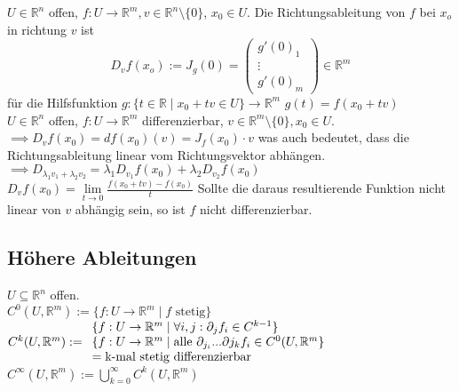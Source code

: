   \(U\in\mathbb{R}^n\) offen, \(f:U\rightarrow \mathbb{R}^m, v\in\mathbb{R}^n\setminus\{0\}\), \(x_0\in U\). Die Richtungsableitung von \(f\) bei \(x_o\) in richtung \(v\) ist \[D_v f(x_o) := J_g(0)=\begin{pmatrix}g'(0)_1\\\vdots\\g'(0)_m\end{pmatrix}\in\mathbb R^m\] für die Hilfsfunktion \(g : \{t\in\mathbb R\mid x_0 + tv\in U\}\rightarrow \mathbb R ^m\) \(g(t)=f(x_0+tv)\)\\
  \(U\in\mathbb R^n\) offen, \(f:U\rightarrow\mathbb R^m\) differenzierbar, \(v\in\mathbb R^m\setminus\{0\}, x_0\in U\). \\\(\implies D_vf(x_0)=df(x_0)(v)=J_f(x_0)\cdot v\) was auch bedeutet, dass die Richtungsableitung linear vom Richtungsvektor abhängen.\\
  \(\implies D_{\lambda_1v_1+\lambda_2v_2}=\lambda_1D_{v_1}f(x_0)+\lambda_2D_{v_2}f(x_0)\)\\
  \(D_vf(x_0)=\lim\limits_{t\rightarrow0}\frac{f(x_0+tv)-f(x_0)}{t}\) Sollte die
  daraus resultierende Funktion nicht linear von \(v\) abhängig sein, so ist
  \(f\) nicht differenzierbar.\\
\subsection{Höhere Ableitungen}
    \(U\subseteq\mathbb R^n\) offen.\\
    \(C^0(U,\mathbb R^m):=\{f:U\rightarrow\mathbb R^m\mid f \text{ stetig}\}\)\\
    \(C^k(U,\mathbb R^m):=\\
    \begin{array}{ll}\{f:U\rightarrow\mathbb R^m\mid \forall i,j:\partial_jf_i\in C^{k-1}\}\\
    \{f:U\rightarrow\mathbb R^m\mid\text{alle }\partial_{j_i}...\partial{j_k}f_i\in C^0(U,\mathbb R^m\}\\=\text{k-mal stetig differenzierbar}\end{array}\)
    \(C^\infty(U,\mathbb R^m):=\bigcup\limits_{k=0}^\infty C^k(U,\mathbb R^m)\) 
    

